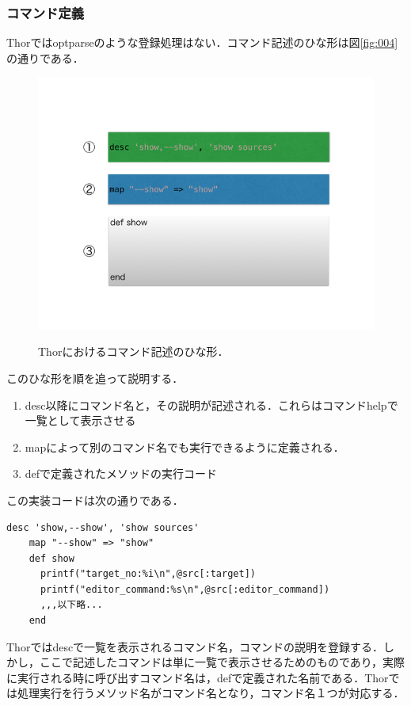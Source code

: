 \subsubsection{コマンド定義}
Thorではoptparseのような登録処理はない．コマンド記述のひな形は図\ref{fig:004}の通りである．

\begin{figure}[htbp]\begin{center}
\includegraphics[width=12cm,bb= 0 0 937 753]{../figs/./hikiutils_yamane.004.jpg}
\caption{Thorにおけるコマンド記述のひな形．}
\label{fig:004}
\label{default}\end{center}\end{figure}
このひな形を順を追って説明する．

\begin{enumerate}
\item desc以降にコマンド名と，その説明が記述される．これらはコマンドhelpで一覧として表示させる
\item mapによって別のコマンド名でも実行できるように定義される．
\item defで定義されたメソッドの実行コード
\end{enumerate}
この実装コードは次の通りである．
\begin{lstlisting}[style=customRuby,basicstyle={\scriptsize\ttfamily}]
    desc 'show,--show', 'show sources'
    map "--show" => "show"
    def show
      printf("target_no:%i\n",@src[:target])
      printf("editor_command:%s\n",@src[:editor_command])
      ,,,以下略...
    end
\end{lstlisting}
Thorではdescで一覧を表示されるコマンド名，コマンドの説明を登録する．しかし，ここで記述したコマンドは単に一覧で表示させるためのものであり，実際に実行される時に呼び出すコマンド名は，defで定義された名前である．Thorでは処理実行を行うメソッド名がコマンド名となり，コマンド名１つが対応する．

